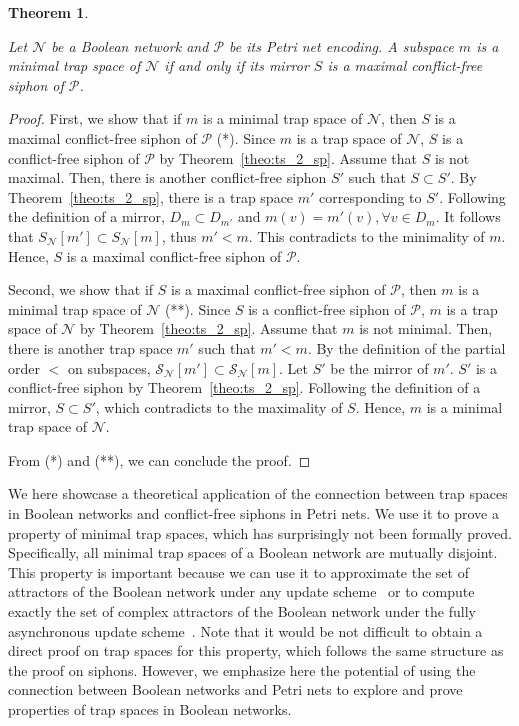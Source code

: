 \documentclass[preprint,12pt]{elsarticle}
\newtheorem{theorem}{Theorem}[section]
\begin{document}
\begin{theorem}%
\label{theo:min_ts_2_max_sp}

  Let \(\mathcal{N}\) be a Boolean network and \(\mathcal{P}\) be its Petri net encoding. A subspace \(m\) is a minimal trap space of \(\mathcal{N}\) if and only if its mirror \(S\) is a maximal conflict-free siphon of \(\mathcal{P}\).

\end{theorem}

\begin{proof}

  First, we show that if \(m\) is a minimal trap space of \(\mathcal{N}\), then \(S\) is a maximal conflict-free siphon of \(\mathcal{P}\) (*).
  Since \(m\) is a trap space of \(\mathcal{N}\), \(S\) is a conflict-free siphon of \(\mathcal{P}\) by Theorem~\ref{theo:ts_2_sp}. Assume that \(S\) is not maximal.
  Then, there is another conflict-free siphon \(S'\) such that \(S \subset S'\).
  By Theorem~\ref{theo:ts_2_sp}, there is a trap space \(m'\) corresponding to \(S'\).
  Following the definition of a mirror, \(D_m \subset D_{m'}\) and \(m(v) = m'(v), \forall v \in D_m\).
  It follows that \(S_{\mathcal{N}}[m'] \subset S_{\mathcal{N}}[m]\), thus \(m' < m\).
  This contradicts to the minimality of \(m\).
  Hence, \(S\) is a maximal conflict-free siphon of \(\mathcal{P}\).

  Second, we show that if \(S\) is a maximal conflict-free siphon of \(\mathcal{P}\), then \(m\) is a minimal trap space of \(\mathcal{N}\) (**).
  Since \(S\) is a conflict-free siphon of \(\mathcal{P}\), \(m\) is a trap space of \(\mathcal{N}\) by Theorem~\ref{theo:ts_2_sp}.
  Assume that \(m\) is not minimal.
  Then, there is another trap space \(m'\) such that \(m' < m\).
  By the definition of the partial order \(<\) on subspaces, \(\mathcal{S}_{\mathcal{N}}[m'] \subset \mathcal{S}_{\mathcal{N}}[m]\). Let \(S'\) be the mirror of \(m'\).
  \(S'\) is a conflict-free siphon by Theorem~\ref{theo:ts_2_sp}.
  Following the definition of a mirror, \(S \subset S'\), which contradicts to the maximality of \(S\).
  Hence, \(m\) is a minimal trap space of \(\mathcal{N}\).

  From (*) and (**), we can conclude the proof.
\end{proof}

We here showcase a theoretical application of the connection between trap spaces in Boolean networks and conflict-free siphons in Petri nets.
We use it to prove a property of minimal trap spaces, which has surprisingly not been formally proved.
Specifically, all minimal trap spaces of a Boolean network are mutually disjoint.
This property is important because we can use it to approximate the set of attractors of the Boolean network under any update scheme~\cite{klarner2015computing} or to compute exactly the set of complex attractors of the Boolean network under the fully asynchronous update scheme~\cite{DBLP:conf/bcb/TrinhHB22}.
Note that it would be not difficult to obtain a direct proof on trap spaces for this property, which follows the same structure as the proof on siphons.
However, we emphasize here the potential of using the connection between Boolean networks and Petri nets to explore and prove properties of trap spaces in Boolean networks.
\end{document}

